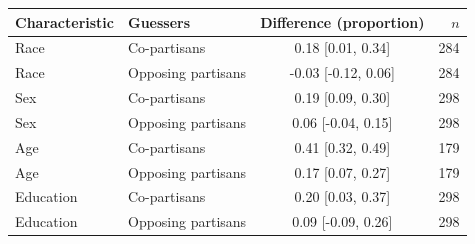\begin{tabular}{llcr}
\toprule
Characteristic & Guessers & Difference (proportion) & $n$ \\
\midrule
Race & Co-partisans & 0.18 [0.01, 0.34] & 284 \\
Race & Opposing partisans & -0.03 [-0.12, 0.06] & 284 \\
Sex & Co-partisans & 0.19 [0.09, 0.30] & 298 \\
Sex & Opposing partisans & 0.06 [-0.04, 0.15] & 298 \\
Age & Co-partisans & 0.41 [0.32, 0.49] & 179 \\
Age & Opposing partisans & 0.17 [0.07, 0.27] & 179 \\
Education & Co-partisans & 0.20 [0.03, 0.37] & 298 \\
Education & Opposing partisans & 0.09 [-0.09, 0.26] & 298 \\
\bottomrule
\end{tabular}
